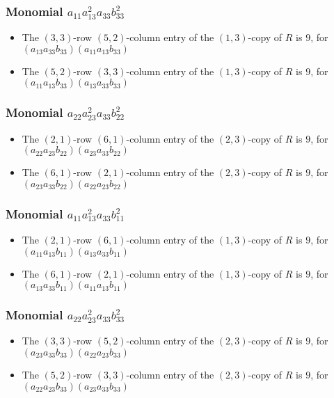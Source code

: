 \documentclass{article}
\begin{document}
\subsubsection{Monomial $ a_{11} a_{13}^{2} a_{33} b_{33}^{2} $}

\begin{itemize}
\item The $(3, 3)$-row $(5, 2)$-column entry of the $ \left(1, 3\right) $-copy of $R$ is $ 9 $, for $( a_{13} a_{33} b_{33} )( a_{11} a_{13} b_{33} )$ 
\item The $(5, 2)$-row $(3, 3)$-column entry of the $ \left(1, 3\right) $-copy of $R$ is $ 9 $, for $( a_{11} a_{13} b_{33} )( a_{13} a_{33} b_{33} )$ 
\end{itemize}
\subsubsection{Monomial $ a_{22} a_{23}^{2} a_{33} b_{22}^{2} $}

\begin{itemize}
\item The $(2, 1)$-row $(6, 1)$-column entry of the $ \left(2, 3\right) $-copy of $R$ is $ 9 $, for $( a_{22} a_{23} b_{22} )( a_{23} a_{33} b_{22} )$ 
\item The $(6, 1)$-row $(2, 1)$-column entry of the $ \left(2, 3\right) $-copy of $R$ is $ 9 $, for $( a_{23} a_{33} b_{22} )( a_{22} a_{23} b_{22} )$ 
\end{itemize}
\subsubsection{Monomial $ a_{11} a_{13}^{2} a_{33} b_{11}^{2} $}

\begin{itemize}
\item The $(2, 1)$-row $(6, 1)$-column entry of the $ \left(1, 3\right) $-copy of $R$ is $ 9 $, for $( a_{11} a_{13} b_{11} )( a_{13} a_{33} b_{11} )$ 
\item The $(6, 1)$-row $(2, 1)$-column entry of the $ \left(1, 3\right) $-copy of $R$ is $ 9 $, for $( a_{13} a_{33} b_{11} )( a_{11} a_{13} b_{11} )$ 
\end{itemize}
\subsubsection{Monomial $ a_{22} a_{23}^{2} a_{33} b_{33}^{2} $}

\begin{itemize}
\item The $(3, 3)$-row $(5, 2)$-column entry of the $ \left(2, 3\right) $-copy of $R$ is $ 9 $, for $( a_{23} a_{33} b_{33} )( a_{22} a_{23} b_{33} )$ 
\item The $(5, 2)$-row $(3, 3)$-column entry of the $ \left(2, 3\right) $-copy of $R$ is $ 9 $, for $( a_{22} a_{23} b_{33} )( a_{23} a_{33} b_{33} )$ 
\end{itemize}
\end{document}
